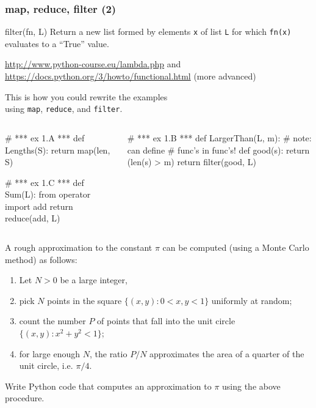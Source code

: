 \documentclass[english,serif,mathserif]{beamer}
\begin{document}
\begin{frame}
  \frametitle{map, reduce, filter (2)}

  \begin{describe}{filter(fn, L)}
    Return a new list formed by elements \texttt{x} of list \texttt{L} for which
    \texttt{fn(x)} evaluates to a ``True'' value.
  \end{describe}

  \+
  \begin{seealso}
    \url{http://www.python-course.eu/lambda.php}
    and \url{https://docs.python.org/3/howto/functional.html} (more advanced)
  \end{seealso}
\end{frame}


\begin{frame}[fragile]
  This is how you could rewrite the examples \\
  using \texttt{map}, \texttt{reduce}, and \texttt{filter}.

  \begin{columns}
\begin{column}{0.5\linewidth}
\begin{python}
# *** ex 1.A ***
def Lengths(S):
  return map(len, S)

# *** ex 1.C ***
def Sum(L):
  from operator import add
  return reduce(add, L)
\end{python}
\end{column}
    \begin{column}{0.5\linewidth}
\begin{python}
# *** ex 1.B ***
def LargerThan(L, m):
  # note: can define
  # func's in func's!
  def good(s):
    return (len(s) > m)
  return filter(good, L)
\end{python}
\end{column}
  \end{columns}
\end{frame}


\begin{frame}
  \begin{exercise*}[1.E]
    A rough approximation to the constant $\pi$ can be computed (using
    a Monte Carlo method) as follows:
    \begin{enumerate}
    \item Let $N>0$ be a large integer,
    \item pick $N$ points in the square $\{(x,y): 0 < x, y < 1 \}$ uniformly at random;
    \item count the number $P$ of points that fall into the unit circle $\{(x,y): x^2 + y^2 < 1 \}$;
    \item for large enough $N$, the ratio $P/N$ approximates the area of a quarter of the unit circle, i.e. $\pi/4$.
    \end{enumerate}
    Write Python code that computes an approximation to $\pi$ using the above procedure.
  \end{exercise*}
\end{frame}
\end{document}
